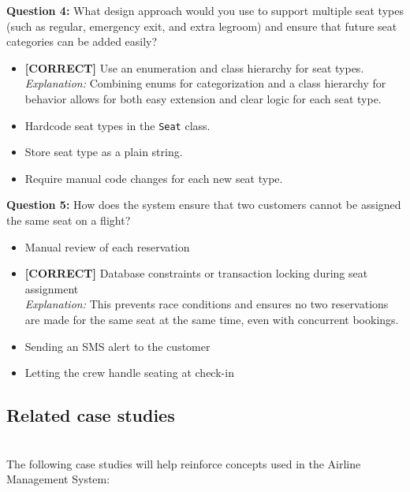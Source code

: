 \vspace{0.3cm}
\noindent
\textbf{Question 4:} What design approach would you use to support multiple seat types (such as regular, emergency exit, and extra legroom) and ensure that future seat categories can be added easily?
\\[0.2cm]
\begin{itemize}
 \item \textbf{[CORRECT]} Use an enumeration and class hierarchy for seat types.
\\[0.1cm]
\textit{Explanation:} 
Combining enums for categorization and a class hierarchy for behavior allows for both easy extension and clear logic for each seat type.
 \item Hardcode seat types in the \texttt{Seat} class.
 \item Store seat type as a plain string.
 \item Require manual code changes for each new seat type.
\end{itemize}
\vspace{0.3cm}
\noindent
\textbf{Question 5:} How does the system ensure that two customers cannot be assigned the same seat on a flight?
\\[0.2cm]
\begin{itemize}
 \item Manual review of each reservation
 \item \textbf{[CORRECT]} Database constraints or transaction locking during seat assignment
\\[0.1cm]
\textit{Explanation:} 
This prevents race conditions and ensures no two reservations are made for the same seat at the same time, even with concurrent bookings.
 \item Sending an SMS alert to the customer
 \item Letting the crew handle seating at check-in
\end{itemize}

\subsection{Related case studies}\label{i3ON28R6p4A02N1mny76g}
\\
The following case studies will help reinforce concepts used in the Airline Management System:

